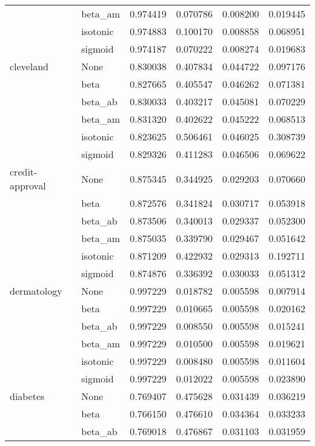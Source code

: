 \begin{tabular}{llrrrr}
        & beta\_am &  0.974419 &  0.070786 &  0.008200 &  0.019445 \\
        & isotonic &  0.974883 &  0.100170 &  0.008858 &  0.068951 \\
        & sigmoid &  0.974187 &  0.070222 &  0.008274 &  0.019683 \\
cleveland & None &  0.830038 &  0.407834 &  0.044722 &  0.097176 \\
        & beta &  0.827665 &  0.405547 &  0.046262 &  0.071381 \\
        & beta\_ab &  0.830033 &  0.403217 &  0.045081 &  0.070229 \\
        & beta\_am &  0.831320 &  0.402622 &  0.045222 &  0.068513 \\
        & isotonic &  0.823625 &  0.506461 &  0.046025 &  0.308739 \\
        & sigmoid &  0.829326 &  0.411283 &  0.046506 &  0.069622 \\
credit-approval & None &  0.875345 &  0.344925 &  0.029203 &  0.070660 \\
        & beta &  0.872576 &  0.341824 &  0.030717 &  0.053918 \\
        & beta\_ab &  0.873506 &  0.340013 &  0.029337 &  0.052300 \\
        & beta\_am &  0.875035 &  0.339790 &  0.029467 &  0.051642 \\
        & isotonic &  0.871209 &  0.422932 &  0.029313 &  0.192711 \\
        & sigmoid &  0.874876 &  0.336392 &  0.030033 &  0.051312 \\
dermatology & None &  0.997229 &  0.018782 &  0.005598 &  0.007914 \\
        & beta &  0.997229 &  0.010665 &  0.005598 &  0.020162 \\
        & beta\_ab &  0.997229 &  0.008550 &  0.005598 &  0.015241 \\
        & beta\_am &  0.997229 &  0.010500 &  0.005598 &  0.019621 \\
        & isotonic &  0.997229 &  0.008480 &  0.005598 &  0.011604 \\
        & sigmoid &  0.997229 &  0.012022 &  0.005598 &  0.023890 \\
diabetes & None &  0.769407 &  0.475628 &  0.031439 &  0.036219 \\
        & beta &  0.766150 &  0.476610 &  0.034364 &  0.033233 \\
        & beta\_ab &  0.769018 &  0.476867 &  0.031103 &  0.031959 \\

\end{tabular}
